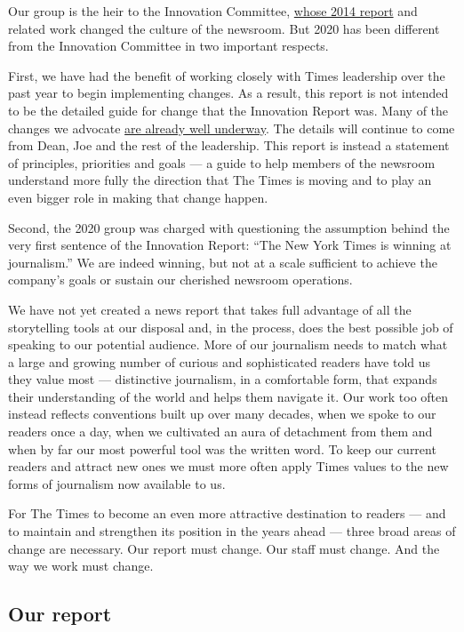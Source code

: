 Our group is the heir to the Innovation Committee,
\href{http://www.niemanlab.org/2014/05/the-leaked-new-york-times-innovation-report-is-one-of-the-key-documents-of-this-media-age/}{whose
2014 report} and related work changed the culture of the newsroom. But
2020 has been different from the Innovation Committee in two important
respects.

First, we have had the benefit of working closely with Times leadership
over the past year to begin implementing changes. As a result, this
report is not intended to be the detailed guide for change that the
Innovation Report was. Many of the changes we advocate
\href{http://www.nytco.com/press/blog/}{are already well underway}. The
details will continue to come from Dean, Joe and the rest of the
leadership. This report is instead a statement of principles, priorities
and goals --- a guide to help members of the newsroom understand more
fully the direction that The Times is moving and to play an even bigger
role in making that change happen.

Second, the 2020 group was charged with questioning the assumption
behind the very first sentence of the Innovation Report: ``The New York
Times is winning at journalism.'' We are indeed winning, but not at a
scale sufficient to achieve the company's goals or sustain our cherished
newsroom operations.

We have not yet created a news report that takes full advantage of all
the storytelling tools at our disposal and, in the process, does the
best possible job of speaking to our potential audience. More of our
journalism needs to match what a large and growing number of curious and
sophisticated readers have told us they value most --- distinctive
journalism, in a comfortable form, that expands their understanding of
the world and helps them navigate it. Our work too often instead
reflects conventions built up over many decades, when we spoke to our
readers once a day, when we cultivated an aura of detachment from them
and when by far our most powerful tool was the written word. To keep our
current readers and attract new ones we must more often apply Times
values to the new forms of journalism now available to us.

For The Times to become an even more attractive destination to readers
--- and to maintain and strengthen its position in the years ahead ---
three broad areas of change are necessary. Our report must change. Our
staff must change. And the way we work must change.

\hypertarget{our-report}{%
\subsection{Our report}\label{our-report}}

